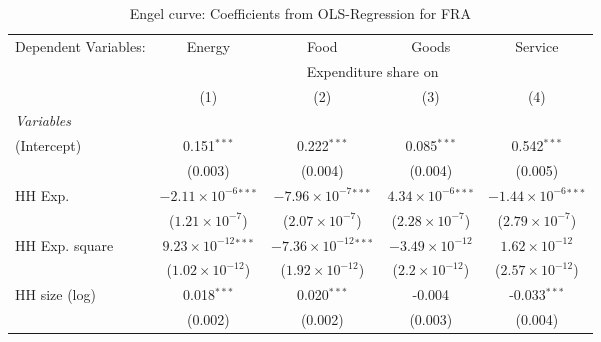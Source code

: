 
\begin{table}[htbp!]
   \centering
   \small
   \begin{adjustbox}{width = 1\textwidth, max height = 0.95\textheight, center}
      \begin{threeparttable}[b]
         \caption{\label{tab:Engel_parametric_FRA} Engel curve: Coefficients from OLS-Regression for FRA}
         \begin{tabular}{lcccc}
            \tabularnewline \midrule \midrule
            Dependent Variables: & Energy                         & Food                            & Goods                         & Service\\  
             & \multicolumn{4}{c}{Expenditure share on} \\ 
                                 & (1)                            & (2)                             & (3)                           & (4)\\  
            \midrule
            \emph{Variables}\\
            (Intercept)          & 0.151$^{***}$                  & 0.222$^{***}$                   & 0.085$^{***}$                 & 0.542$^{***}$\\   
                                 & (0.003)                        & (0.004)                         & (0.004)                       & (0.005)\\   
            HH Exp.              & $-2.11\times 10^{-6}$$^{***}$  & $-7.96\times 10^{-7}$$^{***}$   & $4.34\times 10^{-6}$$^{***}$  & $-1.44\times 10^{-6}$$^{***}$\\    
                                 & ($1.21\times 10^{-7}$)         & ($2.07\times 10^{-7}$)          & ($2.28\times 10^{-7}$)        & ($2.79\times 10^{-7}$)\\    
            HH Exp. square       & $9.23\times 10^{-12}$$^{***}$  & $-7.36\times 10^{-12}$$^{***}$  & $-3.49\times 10^{-12}$        & $1.62\times 10^{-12}$\\    
                                 & ($1.02\times 10^{-12}$)        & ($1.92\times 10^{-12}$)         & ($2.2\times 10^{-12}$)        & ($2.57\times 10^{-12}$)\\    
            HH size (log)        & 0.018$^{***}$                  & 0.020$^{***}$                   & -0.004                        & -0.033$^{***}$\\   
                                 & (0.002)                        & (0.002)                         & (0.003)                       & (0.004)\\   

\end{tabular}
\end{threeparttable}
\end{adjustbox}
\end{table}
